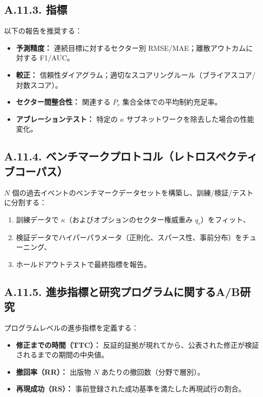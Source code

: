 \documentclass[13pt,a4paper]{ltjsarticle}
\begin{document}
	\subsection*{A.11.3. 指標}
	以下の報告を推奨する：
	\begin{itemize}[leftmargin=*]
		\item \textbf{予測精度：} 連続目標に対するセクター別 RMSE/MAE；離散アウトカムに対する F1/AUC。
		\item \textbf{較正：} 信頼性ダイアグラム；適切なスコアリングルール（ブライアスコア/対数スコア）。
		\item \textbf{セクター間整合性：} 関連する $P_r$ 集合全体での平均制約充足率。
		\item \textbf{アブレーションテスト：} 特定の $\kappa$ サブネットワークを除去した場合の性能変化。
	\end{itemize}
	
	\subsection*{A.11.4. ベンチマークプロトコル（レトロスペクティブコーパス）}
	$N$ 個の過去イベントのベンチマークデータセットを構築し、訓練/検証/テストに分割する：
	\begin{enumerate}[leftmargin=*]
		\item 訓練データで $\kappa$（およびオプションのセクター権威重み $q_r$）をフィット、
		\item 検証データでハイパーパラメータ（正則化、スパース性、事前分布）をチューニング、
		\item ホールドアウトテストで最終指標を報告。
	\end{enumerate}
	
	\subsection*{A.11.5. 進歩指標と研究プログラムに関するA/B研究}
	プログラムレベルの進歩指標を定義する：
	\begin{itemize}[leftmargin=*]
		\item \textbf{修正までの時間（TTC）：} 反証的証拠が現れてから、公表された修正が検証されるまでの期間の中央値。
		\item \textbf{撤回率（RR）：} 出版物 $N$ あたりの撤回数（分野で層別）。
		\item \textbf{再現成功（RS）：} 事前登録された成功基準を満たした再現試行の割合。
	\end{itemize}
	
\end{document}
